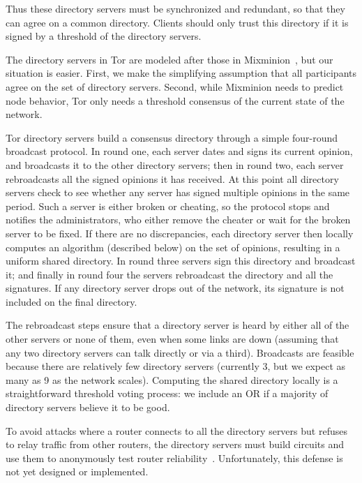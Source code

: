 \documentclass[twocolumn]{article}
\begin{document}
Thus these directory servers must be synchronized and redundant, so
that they can agree on a common directory.  Clients should only trust
this directory if it is signed by a threshold of the directory
servers.

The directory servers in Tor are modeled after those in
Mixminion~\cite{minion-design}, but our situation is easier. First,
we make the
simplifying assumption that all participants agree on the set of
directory servers. Second, while Mixminion needs to predict node
behavior, Tor only needs a threshold consensus of the current
state of the network.

Tor directory servers build a consensus directory through a simple
four-round broadcast protocol.  In round one, each server dates and
signs its current opinion, and broadcasts it to the other directory
servers; then in round two, each server rebroadcasts all the signed
opinions it has received.  At this point all directory servers check
to see whether any server has signed multiple opinions in the same
period. Such a server is either broken or cheating, so the protocol
stops and notifies the administrators, who either remove the cheater
or wait for the broken server to be fixed.  If there are no
discrepancies, each directory server then locally computes an algorithm
(described below)
on the set of opinions, resulting in a uniform shared directory. In
round three servers sign this directory and broadcast it; and finally
in round four the servers rebroadcast the directory and all the
signatures.  If any directory server drops out of the network, its
signature is not included on the final directory.

The rebroadcast steps ensure that a directory server is heard by
either all of the other servers or none of them, even when some links
are down (assuming that any two directory servers can talk directly or
via a third). Broadcasts are feasible because there are relatively few
directory servers (currently 3, but we expect as many as 9 as the network
scales). Computing the shared directory locally is a straightforward
threshold voting process: we include an OR if a majority of directory
servers believe it to be good.

To avoid attacks where a router connects to all the directory servers
but refuses to relay traffic from other routers, the directory servers
must build circuits and use them to anonymously test router
reliability~\cite{mix-acc}. Unfortunately, this defense is not yet
designed or
implemented.
\end{document}
